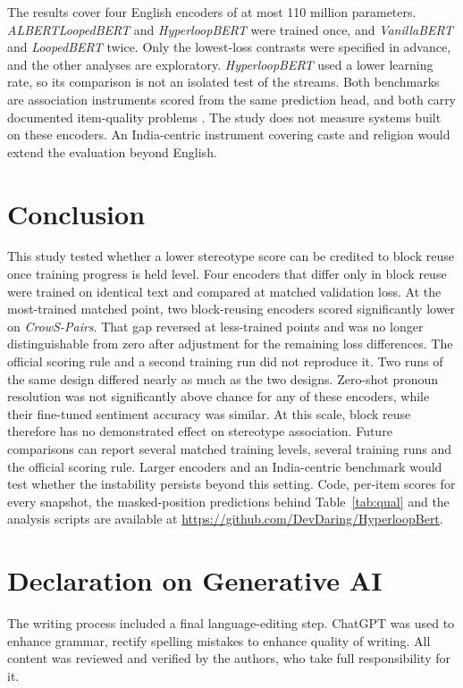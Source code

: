 \documentclass[sigconf,natbib=true]{acmart}
\begin{document}
The results cover four English encoders of at most 110 million parameters.
\emph{ALBERTLoopedBERT} and \emph{HyperloopBERT} were trained once, and
\emph{VanillaBERT} and \emph{LoopedBERT} twice. Only the lowest-loss contrasts
were specified in advance, and the other analyses are exploratory.
\emph{HyperloopBERT} used a lower learning rate, so its comparison is not an
isolated test of the streams. Both benchmarks are association instruments scored
from the same prediction head, and both carry documented item-quality problems
\citep{blodgett2021salmon}. The study does not measure systems built on these
encoders. An India-centric instrument covering caste and religion
\citep{khandelwal2023indianbhed} would extend the evaluation beyond English.

\section{Conclusion}
\label{sec:conclusion}

This study tested whether a lower stereotype score can be credited to block
reuse once training progress is held level. Four encoders that differ only in
block reuse were trained on identical text and compared at matched validation
loss. At the most-trained matched point, two block-reusing encoders scored
significantly lower on \emph{CrowS-Pairs}. That gap reversed at less-trained
points and was no longer distinguishable from zero after adjustment for the
remaining loss differences. The
official scoring rule and a second training run did not reproduce it. Two runs
of the same design differed nearly as much as the two designs. Zero-shot pronoun
resolution was not significantly above chance for any of these encoders, while their fine-tuned
sentiment accuracy was similar. At this scale, block reuse therefore has no
demonstrated effect on stereotype association. Future comparisons can report
several matched training levels, several training runs and the official scoring
rule. Larger encoders and an India-centric benchmark would test whether the
instability persists beyond this setting. Code, per-item scores for every snapshot, the masked-position
predictions behind Table~\ref{tab:qual} and the analysis scripts are available at
\url{https://github.com/DevDaring/HyperloopBert}.

\section*{Declaration on Generative AI}

The writing process included a final language-editing step. ChatGPT was used to
enhance grammar, rectify spelling mistakes to enhance quality of writing. All content
was reviewed and verified by the authors, who take full responsibility for it.



\end{document}
